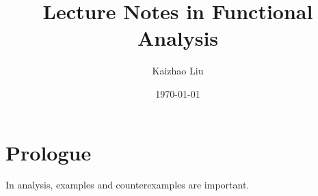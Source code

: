 \documentclass{book}
\title{Lecture Notes in Functional Analysis}
\author{Kaizhao Liu}
\date{\today}
\begin{document}
\maketitle
\tableofcontents

\section{Prologue}
In analysis, examples and counterexamples are important.








\end{document}
